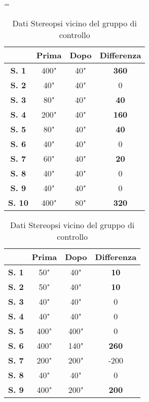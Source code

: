 
\\\ \\\ \\\
\begin{table}[H]
\centering
\setlength\tabcolsep{4pt}
\begin{minipage}{0.48\textwidth}
\centering
\tablewidth=\textwidth

\begin{tabular}{|c|c|c|c|} \hline
{\textbf{}} & {\textbf{Prima}} & {\textbf{Dopo}}& {\textbf{Differenza}} \\ \hline
\textbf{S. 1} & 400" & 40" & \textbf{360} \\ \hline
\textbf{S. 2} & 40" & 40" & 0 \\ \hline
\textbf{S. 3} & 80" & 40" & \textbf{40} \\ \hline
\textbf{S. 4} & 200" & 40" & \textbf{160} \\ \hline
\textbf{S. 5} & 80" & 40" & \textbf{40} \\ \hline
\textbf{S. 6} & 40" & 40" & 0 \\ \hline
\textbf{S. 7} & 60" & 40" & \textbf{20} \\ \hline
\textbf{S. 8} & 40" & 40" & 0 \\ \hline
\textbf{S. 9} & 40" & 40" & 0 \\ \hline
\textbf{S. 10} & 400" & 80" & \textbf{320} \\ \hline
\end{tabular} 
\caption{Dati Stereopsi vicino del gruppo sperimentale}

\label{tab:accuracy} 
\end{minipage}%
\hfill
\begin{minipage}{0.48\textwidth}
\centering

\begin{tabular}{|c|c|c|c|} \hline
{\textbf{}} & {\textbf{Prima}} & {\textbf{Dopo}}& {\textbf{Differenza}} \\ \hline
\textbf{S. 1} & 50" & 40" & \textbf{10}\\ \hline
\textbf{S. 2} & 50" & 40" & \textbf{10} \\ \hline
\textbf{S. 3} & 40" & 40" & 0 \\ \hline
\textbf{S. 4} & 40" & 40" & 0 \\ \hline
\textbf{S. 5} & 400" & 400" & 0 \\ \hline
\textbf{S. 6} & 400" & 140" & \textbf{260} \\ \hline
\textbf{S. 7} & 200" & 200" & -200\\ \hline
\textbf{S. 8} & 40" & 40" & 0 \\ \hline
\textbf{S. 9} & 400" & 200" & \textbf{200} \\ \hline
\end{tabular} 
\caption{Dati Stereopsi vicino del gruppo di controllo}

 \label{tab:ompdiff} 
\end{minipage}
\end{table}




